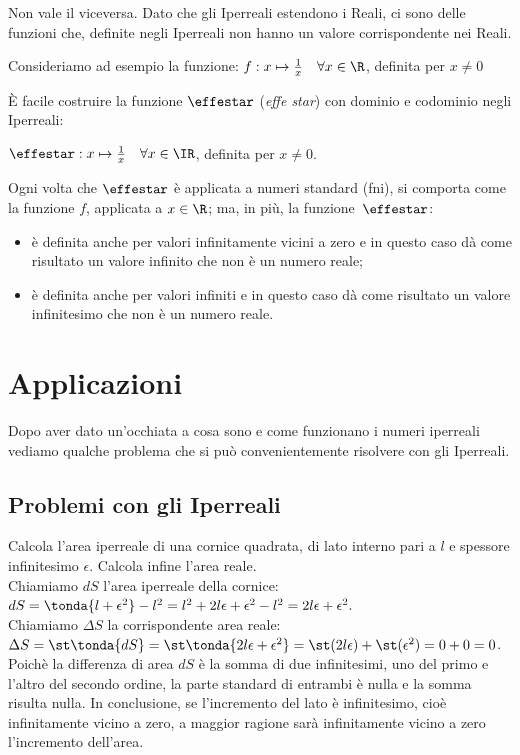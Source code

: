\begin{osservazione}
 Non vale il viceversa. Dato che gli Iperreali estendono i Reali, ci sono 
delle 
funzioni che, definite negli Iperreali non hanno un valore corrispondente nei 
Reali.

\begin{esempio}
 Consideriamo ad esempio la funzione: 
$f: x \mapsto \frac{1}{x} \quad \forall x \in \R$, definita per $x\ne 0$

È facile costruire la funzione $\effestar$ (\emph{effe star}) con dominio e 
codominio negli Iperreali:

$\effestar: x \mapsto \frac{1}{x} \quad \forall x \in \IR$, definita per 
$x\ne 0$.

Ogni volta che $\effestar$ è applicata a numeri standard (fni), si comporta 
come
la funzione $f$, applicata a $x \in \R$; ma, in più, la funzione~$\effestar$:
\begin{itemize} [noitemsep]
 \item 
è definita anche per valori infinitamente vicini a zero e 
in questo caso dà come risultato un valore infinito che non è un numero reale;
 \item 
è definita anche per valori infiniti e
in questo caso dà come risultato un valore infinitesimo che non è un numero 
reale. 
\end{itemize}
\end{esempio}
\end{osservazione}

\section{Applicazioni}
\label{sec:insnum_applicazioni}

Dopo aver dato un'occhiata a cosa sono e come funzionano i numeri iperreali 
vediamo qualche problema che si può convenientemente risolvere con gli 
Iperreali.

\subsection{Problemi con gli Iperreali}
\label{subsec:insnum_problemi}

\begin{esempio}
Calcola l'area iperreale di una cornice quadrata, di lato interno pari a $l$ e
spessore infinitesimo $\epsilon$. Calcola infine l'area reale.\\
Chiamiamo $dS$ l'area iperreale della cornice:
\(dS=\tonda{l+\epsilon^2}
-l^2=l^2+2l\epsilon+\epsilon^2-l^2=2l\epsilon+\epsilon^2.\)\\
Chiamiamo $\Delta S$ la corrispondente area reale:
\(\Delta S=\st\tonda{dS}=\st\tonda{2l\epsilon+\epsilon^2}=
\st(2l\epsilon)+\st(\epsilon^2)=0+0=0\).\\
Poichè la differenza di area $dS$ è la somma di due infinitesimi, uno del 
primo e 
l'altro del secondo ordine, la parte standard di entrambi è nulla e la somma 
risulta nulla. In conclusione, se l'incremento del lato è infinitesimo,
cioè infinitamente vicino a zero, a maggior ragione sarà infinitamente vicino
a zero l'incremento dell'area.
\end{esempio}

